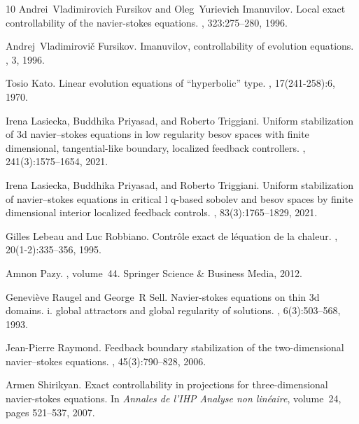 \documentclass[preprint,12pt]{elsarticle}
\begin{document}
\begin{thebibliography}{10}
Andrei~Vladimirovich Fursikov and Oleg~Yurievich Imanuvilov.
\newblock Local exact controllability of the navier-stokes equations.
, 323:275--280, 1996.

Andrej~Vladimirovi{\v{c}} Fursikov.
\newblock Imanuvilov, controllability of evolution equations.
, 3, 1996.

Tosio Kato.
\newblock Linear evolution equations of “hyperbolic” type.
, 17(241-258):6, 1970.

Irena Lasiecka, Buddhika Priyasad, and Roberto Triggiani.
\newblock Uniform stabilization of 3d navier--stokes equations in low regularity besov spaces with finite dimensional, tangential-like boundary, localized feedback controllers.
, 241(3):1575--1654, 2021.

Irena Lasiecka, Buddhika Priyasad, and Roberto Triggiani.
\newblock Uniform stabilization of navier--stokes equations in critical l q-based sobolev and besov spaces by finite dimensional interior localized feedback controls.
, 83(3):1765--1829, 2021.

Gilles Lebeau and Luc Robbiano.
\newblock Contr{\^o}le exact de l{\'e}quation de la chaleur.
, 20(1-2):335--356, 1995.

Amnon Pazy.
, volume~44.
\newblock Springer Science \& Business Media, 2012.

Genevi{\`e}ve Raugel and George~R Sell.
\newblock Navier-stokes equations on thin 3d domains. i. global attractors and global regularity of solutions.
, 6(3):503--568, 1993.

Jean-Pierre Raymond.
\newblock Feedback boundary stabilization of the two-dimensional navier--stokes equations.
, 45(3):790--828, 2006.

Armen Shirikyan.
\newblock Exact controllability in projections for three-dimensional navier-stokes equations.
\newblock In {\em Annales de l'IHP Analyse non lin{\'e}aire}, volume~24, pages 521--537, 2007.


\end{thebibliography}
\end{document}
